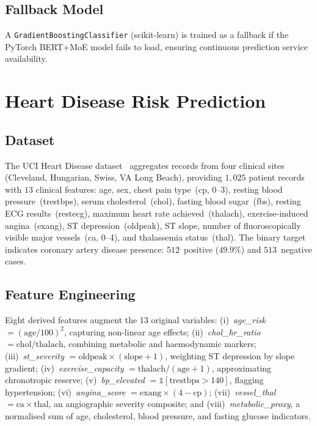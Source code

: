 \documentclass[journal,10pt,twoside]{IEEEtran}
\begin{document}
\subsection{Fallback Model}

A \texttt{GradientBoostingClassifier} (scikit-learn) is trained as a fallback
if the PyTorch BERT+MoE model fails to load, ensuring continuous prediction service
availability.

\section{Heart Disease Risk Prediction}
\label{sec:heartdisease}

\subsection{Dataset}

The UCI Heart Disease dataset~\cite{uci_heart,detrano1989} aggregates records
from four clinical sites (Cleveland, Hungarian, Swiss, VA Long Beach), providing
$1{,}025$ patient records with $13$ clinical features:
age, sex, chest pain type~(cp, 0--3), resting blood pressure~(trestbps),
serum cholesterol~(chol), fasting blood sugar~(fbs), resting ECG results~(restecg),
maximum heart rate achieved~(thalach), exercise-induced angina~(exang),
ST depression~(oldpeak), ST slope, number of fluoroscopically visible major
vessels~(ca, 0--4), and thalassemia status~(thal).
The binary target indicates coronary artery disease presence:
$512$~positive ($49.9\%$) and $513$~negative cases.

\subsection{Feature Engineering}

Eight derived features augment the 13 original variables:
(i)~\textit{age\_risk} $= (\text{age}/100)^2$, capturing non-linear age effects;
(ii)~\textit{chol\_hr\_ratio} $= \text{chol}/\text{thalach}$, combining metabolic
and haemodynamic markers;
(iii)~\textit{st\_severity} $= \text{oldpeak} \times (\text{slope}+1)$, weighting
ST depression by slope gradient;
(iv)~\textit{exercise\_capacity} $= \text{thalach}/(\text{age}+1)$, approximating
chronotropic reserve;
(v)~\textit{bp\_elevated} $= \mathbb{1}[\text{trestbps} > 140]$, flagging hypertension;
(vi)~\textit{angina\_score} $= \text{exang} \times (4 - \text{cp})$;
(vii)~\textit{vessel\_thal} $= \text{ca} \times \text{thal}$, an angiographic
severity composite; and
(viii)~\textit{metabolic\_proxy}, a normalised sum of age, cholesterol, blood
pressure, and fasting glucose indicators.
\end{document}
